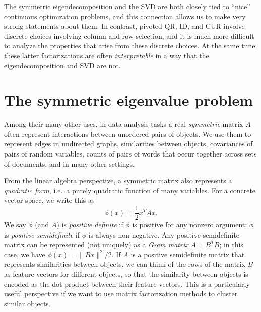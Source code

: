 \documentclass[12pt, leqno]{article} %
\begin{document}
The symmetric eigendecomposition and the SVD are both closely tied to
``nice'' continuous optimization problems, and this connection allows
us to make very strong statements about them.  In contrast, pivoted
QR, ID, and CUR involve discrete choices involving column and row
selection, and it is much more difficult to analyze the properties
that arise from these discrete choices.  At the same time, these
latter factorizations are often {\em interpretable} in a way that
the eigendecomposition and SVD are not.

\section{The symmetric eigenvalue problem}

Among their many other uses, in data analysis tasks a real
{\em symmetric} matrix $A$ often represent interactions between unordered
pairs of objects.  We use them to represent edges in undirected
graphs, similarities between objects, covariances of pairs of random
variables, counts of pairs of words that occur together across sets of
documents, and in many other settings.

From the linear algebra perspective, a symmetric matrix also
represents a {\em quadratic form}, i.e.~a purely quadratic function of
many variables.  For a concrete vector space, we write this as
\[
  \phi(x) = \frac{1}{2} x^T A x.
\]
We say $\phi$ (and $A$) is {\em positive definite} if $\phi$ is
positive for any nonzero argument; $\phi$ is
{\em positive semidefinite} if $\phi$ is always non-negative.  Any positive
semidefinite matrix can be represented (not uniquely) as a
{\em Gram matrix} $A = B^T B$; in this case, we have
$\phi(x) = \|Bx\|^2/2$.  If $A$ is a positive semidefinite matrix that
represents similarities between objects, we can think of the rows of
the matrix $B$ as feature vectors for different objects, so that the
similarity between objects is encoded as the dot product between their
feature vectors.  This is a particularly useful perspective if we want
to use matrix factorization methods to cluster similar objects.
\end{document}
